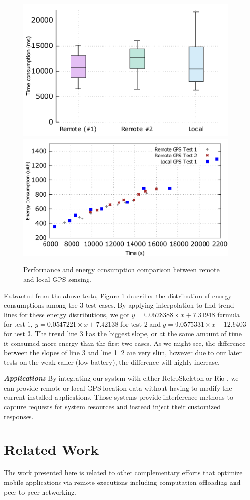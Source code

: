 \documentclass{sig-alternate}[10pt]
\begin{document}
\begin{figure}
	\centering
		\includegraphics[width=.42\textwidth]{data/gps_perf.pdf}
		\includegraphics[width=.47\textwidth]{data/gps_energy_full.pdf}
	\caption{Performance and energy consumption comparison between remote and local GPS sensing.}
	\label{fig:gps_perf}
\end{figure}

Extracted from the above tests, Figure \ref{fig:gps_perf} describes the distribution of energy consumptions among the 3 test cases. By applying interpolation to find trend lines for these energy distributions, we got $y = 0.0528388 \times x + 7.31948$ formula for test 1, $y = 0.0547221 \times x + 7.42138$ for test 2 and $y = 0.0575331 \times x - 12.9403$ for test 3. The trend line 3 has the biggest slope, or at the same amount of time it consumed more energy than the first two cases. As we might see, the difference between the slopes of line 3 and line 1, 2 are very slim, however due to our later tests on the weak caller (low battery), the difference will highly increase. 

\textbf{\emph{Applications}}
By integrating our system with either RetroSkeleton \cite{retro-skel} or Rio \cite{rio}, we can provide remote or local GPS location data without having to modify the current installed applications. Those systems provide interference methods to capture requests for system resources and instead inject their customized responses. 

\section{Related Work}
\label{sec:related}
The work presented here is related to other complementary efforts that optimize mobile applications via remote executions including computation offloading and peer to peer networking.
\end{document}

